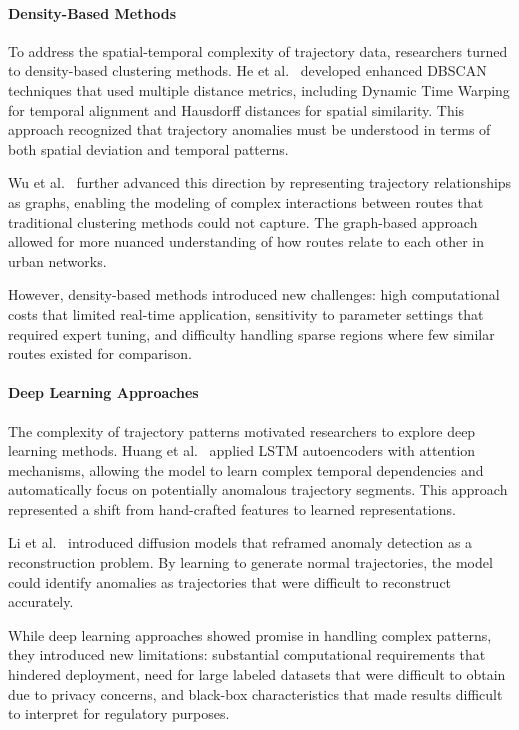 \documentclass[runningheads]{llncs}
\begin{document}
\paragraph{Density-Based Methods}
To address the spatial-temporal complexity of trajectory data, researchers turned to density-based clustering methods. He et al.~\cite{he2020enhanced} developed enhanced DBSCAN techniques that used multiple distance metrics, including Dynamic Time Warping for temporal alignment and Hausdorff distances for spatial similarity. This approach recognized that trajectory anomalies must be understood in terms of both spatial deviation and temporal patterns.

Wu et al.~\cite{wu2023graph} further advanced this direction by representing trajectory relationships as graphs, enabling the modeling of complex interactions between routes that traditional clustering methods could not capture. The graph-based approach allowed for more nuanced understanding of how routes relate to each other in urban networks.

However, density-based methods introduced new challenges: high computational costs that limited real-time application, sensitivity to parameter settings that required expert tuning, and difficulty handling sparse regions where few similar routes existed for comparison.

\paragraph{Deep Learning Approaches}
The complexity of trajectory patterns motivated researchers to explore deep learning methods. Huang et al.~\cite{huang2021lstm} applied LSTM autoencoders with attention mechanisms, allowing the model to learn complex temporal dependencies and automatically focus on potentially anomalous trajectory segments. This approach represented a shift from hand-crafted features to learned representations.

Li et al.~\cite{li2023diffusion} introduced diffusion models that reframed anomaly detection as a reconstruction problem. By learning to generate normal trajectories, the model could identify anomalies as trajectories that were difficult to reconstruct accurately.

While deep learning approaches showed promise in handling complex patterns, they introduced new limitations: substantial computational requirements that hindered deployment, need for large labeled datasets that were difficult to obtain due to privacy concerns, and black-box characteristics that made results difficult to interpret for regulatory purposes.
\end{document}
